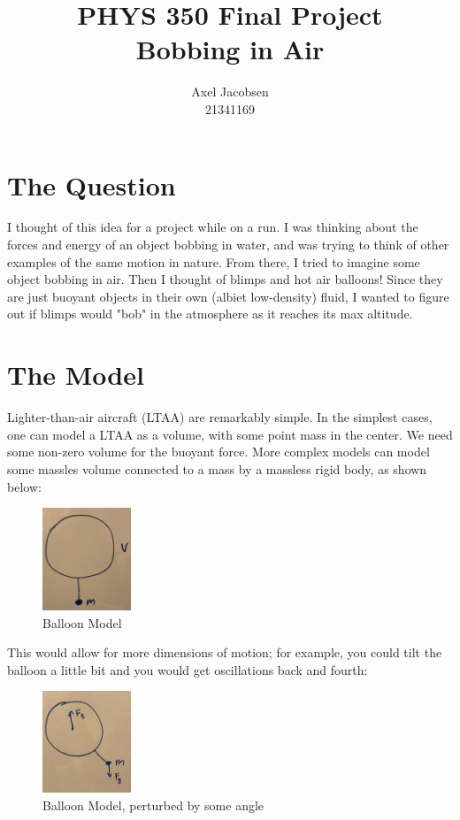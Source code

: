 \documentclass[titlepage]{article}
\begin{document}
\title{
    PHYS 350 Final Project \\
    \large Bobbing in Air
}
\author{Axel Jacobsen \\ 21341169}
\maketitle

\tableofcontents
\newpage

\section{The Question}

I thought of this idea for a project while on a run. I was thinking about the forces and energy of an object bobbing in water, and was trying to think of other examples of the same motion in nature. From there, I tried to imagine some object bobbing in air. Then I thought of blimps and hot air balloons! Since they are just buoyant objects in their own (albiet low-density) fluid, I wanted to figure out if blimps would "bob" in the atmosphere as it reaches its max altitude.

\section{The Model}

Lighter-than-air aircraft (LTAA) are remarkably simple. In the simplest cases, one can model a LTAA as a volume, with some point mass in the center. We need some non-zero volume for the buoyant force. More complex models can model some massles volume connected to a mass by a massless rigid body, as shown below:

\begin{figure}[h]
    \centering
    \includegraphics[width=100px]{balloon.png}
    \caption{Balloon Model}
\end{figure}

This would allow for more dimensions of motion; for example, you could tilt the balloon a little bit and you would get oscillations back and fourth:

\begin{figure}[h]
    \centering
    \includegraphics[width=100px]{balloon_angle.png}
    \caption{Balloon Model, perturbed by some angle}
\end{figure}
\end{document}
